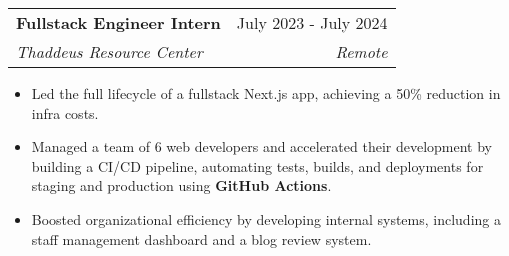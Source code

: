 \documentclass[letterpaper,11pt]{article}
\makeatletter
\newcommand{\resumeItem}[1]{
  \item\setstretch{.95}\small{
    {#1 \vspace{-2pt}}
  }
}
\newcommand{\resumeSubheading}[4]{
  \vspace{-2pt}\item
    \begin{tabular*}{0.97\textwidth}[t]{l@{\extracolsep{\fill}}r}
      \textbf{#1} & #2 \\
      \textit{\small#3} & \textit{\small #4} \\
    \end{tabular*}\vspace{-4.8pt}
}
\newcommand{\resumeItemListStart}{\begin{itemize}}
\newcommand{\resumeItemListEnd}{\end{itemize}\vspace{-5pt}}
\makeatother
\begin{document}

\resumeSubheading
{Fullstack Engineer Intern}{July 2023 - July 2024}
{Thaddeus Resource Center}{Remote}
\resumeItemListStart
\resumeItem{Led the full lifecycle of a fullstack Next.js app, achieving a 50\% reduction in infra costs.}
\resumeItem{Managed a team of 6 web developers and accelerated their development by building a CI/CD pipeline, automating tests, builds, and deployments for staging and production using \textbf{GitHub Actions}.}
\resumeItem{Boosted organizational efficiency by developing internal systems, including a staff management dashboard and a blog review system.}
\resumeItemListEnd
\end{document}

